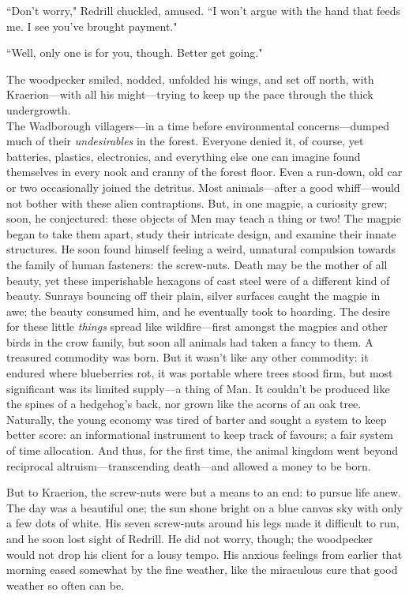 ``Don't worry," Redrill chuckled, amused.
``I won't argue with the hand that feeds me. I see you've brought payment."

``Well, only one is for you, though.
Better get going."

The woodpecker smiled, nodded, unfolded his wings, and set off north, with Kraerion---with all his might---trying to keep up the pace through the thick undergrowth.\\

The Wadborough villagers---in a time before environmental concerns---dumped much of their \textit{undesirables} in the forest.
Everyone denied it, of course, yet batteries, plastics, electronics, and everything else one can imagine found themselves in every nook and cranny of the forest floor.
Even a run-down, old car or two occasionally joined the detritus.
Most animals---after a good whiff---would not bother with these alien contraptions.
But, in one magpie, a curiosity grew; soon, he conjectured: these objects of Men may teach a thing or two!
The magpie began to take them apart, study their intricate design, and examine their innate structures.
He soon found himself feeling a weird, unnatural compulsion towards the family of human fasteners: the screw-nuts.
Death may be the mother of all beauty, yet these imperishable hexagons of cast steel were of a different kind of beauty.
Sunrays bouncing off their plain, silver surfaces caught the magpie in awe; the beauty consumed him, and he eventually took to hoarding.
The desire for these little \textit{things} spread like wildfire---first amongst the magpies and other birds in the crow family, but soon all animals had taken a fancy to them.
A treasured commodity was born.
But it wasn't like any other commodity: it endured where blueberries rot, it was portable where trees stood firm, but most significant was its limited supply---a thing of Man.
It couldn't be produced like the spines of a hedgehog's back, nor grown like the acorns of an oak tree.
Naturally, the young economy was tired of barter and sought a system to keep better score: an informational instrument to keep track of favours; a fair system of time allocation.
And thus, for the first time, the animal kingdom went beyond reciprocal altruism---transcending death---and allowed a money to be born. %

But to Kraerion, the screw-nuts were but a means to an end: to pursue life anew. \\

The day was a beautiful one; the sun shone bright on a blue canvas sky with only a few dots of white.
His seven screw-nuts around his legs made it difficult to run, and he soon lost sight of Redrill.
He did not worry, though; the woodpecker would not drop his client for a lousy tempo.
His anxious feelings from earlier that morning eased somewhat by the fine weather, like the miraculous cure that good weather so often can be.

